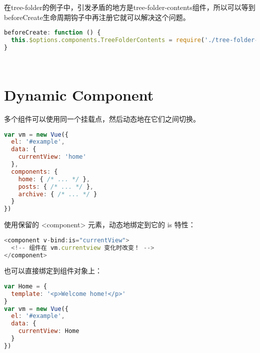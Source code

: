 在tree-folder的例子中，引发矛盾的地方是tree-folder-contents组件，所以可以等到beforeCreate生命周期钩子中再注册它就可以解决这个问题。


\begin{lstlisting}[language=JavaScript]
beforeCreate: function () {
  this.$options.components.TreeFolderContents = require('./tree-folder-contents.vue')
}
\end{lstlisting}


\begin{lstlisting}[language=JavaScript]

\end{lstlisting}




\begin{lstlisting}[language=JavaScript]

\end{lstlisting}


\section{Dynamic Component}


多个组件可以使用同一个挂载点，然后动态地在它们之间切换。

\begin{lstlisting}[language=JavaScript]
var vm = new Vue({
  el: '#example',
  data: {
    currentView: 'home'
  },
  components: {
    home: { /* ... */ },
    posts: { /* ... */ },
    archive: { /* ... */ }
  }
})
\end{lstlisting}


使用保留的 <component> 元素，动态地绑定到它的 is 特性：


\begin{lstlisting}[language=JavaScript]
<component v-bind:is="currentView">
  <!-- 组件在 vm.currentview 变化时改变！ -->
</component>
\end{lstlisting}

也可以直接绑定到组件对象上：

\begin{lstlisting}[language=JavaScript]
var Home = {
  template: '<p>Welcome home!</p>'
}
var vm = new Vue({
  el: '#example',
  data: {
    currentView: Home
  }
})
\end{lstlisting}



\begin{lstlisting}[language=JavaScript]

\end{lstlisting}




